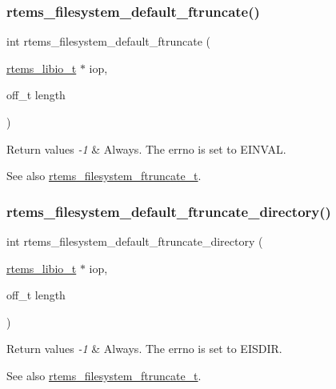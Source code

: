 \subsubsection{\texorpdfstring{rtems\_filesystem\_default\_ftruncate()}{rtems\_filesystem\_default\_ftruncate()}}
{\footnotesize\ttfamily int rtems\+\_\+filesystem\+\_\+default\+\_\+ftruncate (\begin{DoxyParamCaption}\item[{\mbox{\hyperlink{structrtems__libio__tt}{rtems\+\_\+libio\+\_\+t}} $\ast$}]{iop,  }\item[{off\+\_\+t}]{length }\end{DoxyParamCaption})}


\begin{DoxyRetVals}{Return values}
{\em -\/1} & Always. The errno is set to E\+I\+N\+V\+AL.\\
\hline
\end{DoxyRetVals}
\begin{DoxySeeAlso}{See also}
\mbox{\hyperlink{group__LibIOFSHandler_gaf5cc5b12b8ab1799641171b1649de34b}{rtems\+\_\+filesystem\+\_\+ftruncate\+\_\+t}}. 
\end{DoxySeeAlso}
\mbox{\label{group__LibIOFSHandler_ga17c8ee92bd9c2a374973906270a03b79}} 
\subsubsection{\texorpdfstring{rtems\_filesystem\_default\_ftruncate\_directory()}{rtems\_filesystem\_default\_ftruncate\_directory()}}
{\footnotesize\ttfamily int rtems\+\_\+filesystem\+\_\+default\+\_\+ftruncate\+\_\+directory (\begin{DoxyParamCaption}\item[{\mbox{\hyperlink{structrtems__libio__tt}{rtems\+\_\+libio\+\_\+t}} $\ast$}]{iop,  }\item[{off\+\_\+t}]{length }\end{DoxyParamCaption})}


\begin{DoxyRetVals}{Return values}
{\em -\/1} & Always. The errno is set to E\+I\+S\+D\+IR.\\
\hline
\end{DoxyRetVals}
\begin{DoxySeeAlso}{See also}
\mbox{\hyperlink{group__LibIOFSHandler_gaf5cc5b12b8ab1799641171b1649de34b}{rtems\+\_\+filesystem\+\_\+ftruncate\+\_\+t}}. 
\end{DoxySeeAlso}
\mbox{\label{group__LibIOFSHandler_ga50da2d5dcafa7a15fb37916e63e0cd5f}} 
